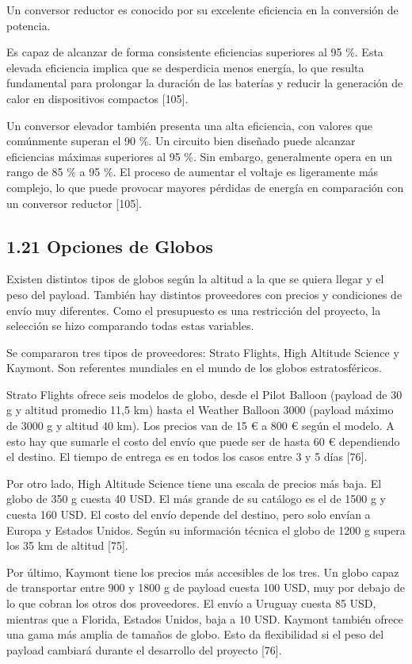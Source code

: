 \documentclass[12pt,a4paper]{article}
\begin{document}
Un conversor reductor es conocido por su excelente eficiencia en la conversión de potencia.

Es capaz de alcanzar de forma consistente eficiencias superiores al 95 \%. Esta elevada eficiencia implica que se desperdicia menos energía, lo que resulta fundamental para prolongar la duración de las baterías y reducir la generación de calor en dispositivos compactos {[}105{]}.

Un conversor elevador también presenta una alta eficiencia, con valores que comúnmente superan el 90 \%. Un circuito bien diseñado puede alcanzar eficiencias máximas superiores al 95 \%. Sin embargo, generalmente opera en un rango de 85 \% a 95 \%. El proceso de aumentar el voltaje es ligeramente más complejo, lo que puede provocar mayores pérdidas de energía en comparación con un conversor reductor {[}105{]}.

\subsection{1.21 Opciones de Globos}\label{opciones-de-globos}

Existen distintos tipos de globos según la altitud a la que se quiera llegar y el peso del payload. También hay distintos proveedores con precios y condiciones de envío muy diferentes. Como el presupuesto es una restricción del proyecto, la selección se hizo comparando todas estas variables.

Se compararon tres tipos de proveedores: Strato Flights, High Altitude Science y Kaymont. Son referentes mundiales en el mundo de los globos estratosféricos.

Strato Flights ofrece seis modelos de globo, desde el Pilot Balloon (payload de 30 g y altitud promedio 11,5 km) hasta el Weather Balloon 3000 (payload máximo de 3000 g y altitud 40 km). Los precios van de 15 € a 800 € según el modelo. A esto hay que sumarle el costo del envío que puede ser de hasta 60 € dependiendo el destino. El tiempo de entrega es en todos los casos entre 3 y 5 días {[}76{]}.

Por otro lado, High Altitude Science tiene una escala de precios más baja. El globo de 350 g cuesta 40 USD. El más grande de su catálogo es el de 1500 g y cuesta 160 USD. El costo del envío depende del destino, pero solo envían a Europa y Estados Unidos. Según su información técnica el globo de 1200 g supera los 35 km de altitud {[}75{]}.

Por último, Kaymont tiene los precios más accesibles de los tres. Un globo capaz de transportar entre 900 y 1800 g de payload cuesta 100 USD, muy por debajo de lo que cobran los otros dos proveedores. El envío a Uruguay cuesta 85 USD, mientras que a Florida, Estados Unidos, baja a 10 USD. Kaymont también ofrece una gama más amplia de tamaños de globo. Esto da flexibilidad si el peso del payload cambiará durante el desarrollo del proyecto {[}76{]}.
\end{document}

